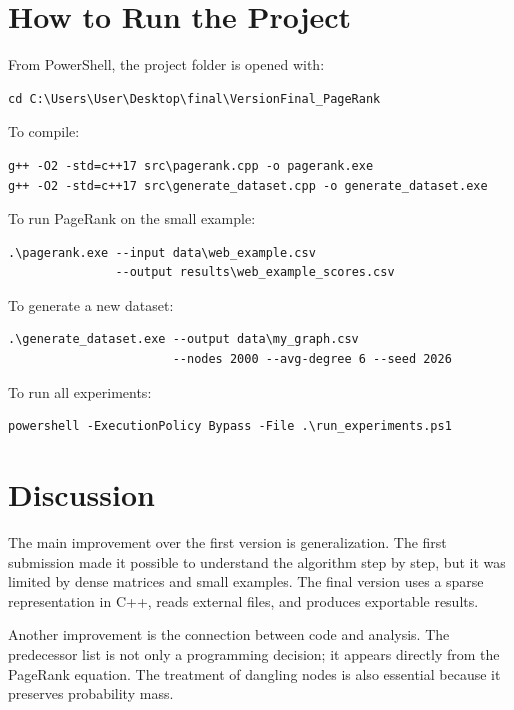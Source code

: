 \documentclass[runningheads]{llncs}
\begin{document}
\section{How to Run the Project}

From PowerShell, the project folder is opened with:

\begin{verbatim}
cd C:\Users\User\Desktop\final\VersionFinal_PageRank
\end{verbatim}

To compile:

\begin{verbatim}
g++ -O2 -std=c++17 src\pagerank.cpp -o pagerank.exe
g++ -O2 -std=c++17 src\generate_dataset.cpp -o generate_dataset.exe
\end{verbatim}

To run PageRank on the small example:

\begin{verbatim}
.\pagerank.exe --input data\web_example.csv
               --output results\web_example_scores.csv
\end{verbatim}

To generate a new dataset:

\begin{verbatim}
.\generate_dataset.exe --output data\my_graph.csv
                       --nodes 2000 --avg-degree 6 --seed 2026
\end{verbatim}

To run all experiments:

\begin{verbatim}
powershell -ExecutionPolicy Bypass -File .\run_experiments.ps1
\end{verbatim}

\section{Discussion}

The main improvement over the first version is generalization. The first submission made it possible to understand the algorithm step by step, but it was limited by dense matrices and small examples. The final version uses a sparse representation in C++, reads external files, and produces exportable results.

Another improvement is the connection between code and analysis. The predecessor list is not only a programming decision; it appears directly from the PageRank equation. The treatment of dangling nodes is also essential because it preserves probability mass.
\end{document}

